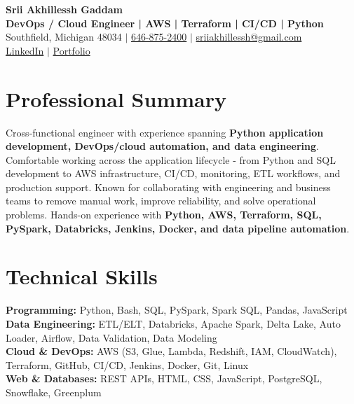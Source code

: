 \documentclass[letterpaper,10pt]{article}
\begin{document}
\fontsize{9.35pt}{10.45pt}\selectfont

\begin{center}
    {\LARGE \textbf{Srii Akhillessh Gaddam}} \\[-1pt]
    \textbf{DevOps / Cloud Engineer | AWS | Terraform | CI/CD | Python} \\[2pt]
    Southfield, Michigan 48034 $|$
    \href{tel:6468752400}{646-875-2400} $|$
    \href{mailto:sriiakhillessh@gmail.com}{sriiakhillessh@gmail.com} \\[1pt]
    \href{https://www.linkedin.com/in/srii-akhiilessh-gaddam-b48668191/}{LinkedIn} $|$
    \href{https://sriiakhillesshg.github.io/portfolio/}{Portfolio}
\end{center}
\vspace{-8pt}

\section{Professional Summary}
\small{Cross-functional engineer with experience spanning \textbf{Python application development, DevOps/cloud automation, and data engineering}. Comfortable working across the application lifecycle - from Python and SQL development to AWS infrastructure, CI/CD, monitoring, ETL workflows, and production support. Known for collaborating with engineering and business teams to remove manual work, improve reliability, and solve operational problems. Hands-on experience with \textbf{Python, AWS, Terraform, SQL, PySpark, Databricks, Jenkins, Docker, and data pipeline automation}.}

\section{Technical Skills}
\small{
\textbf{Programming:} Python, Bash, SQL, PySpark, Spark SQL, Pandas, JavaScript \\
\textbf{Data Engineering:} ETL/ELT, Databricks, Apache Spark, Delta Lake, Auto Loader, Airflow, Data Validation, Data Modeling \\
\textbf{Cloud \& DevOps:} AWS (S3, Glue, Lambda, Redshift, IAM, CloudWatch), Terraform, GitHub, CI/CD, Jenkins, Docker, Git, Linux \\
\textbf{Web \& Databases:} REST APIs, HTML, CSS, JavaScript, PostgreSQL, Snowflake, Greenplum
}
\end{document}
